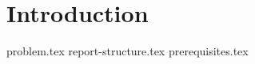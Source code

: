 \documentclass{article}
\begin{document}
\section{Introduction}


{problem.tex}
{report-structure.tex}
{prerequisites.tex}
\end{document}
